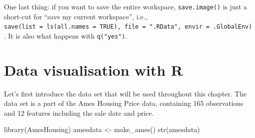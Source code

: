 \documentclass[
]{book}
\newenvironment{Shaded}{\begin{snugshade}}{\end{snugshade}}
\newcommand{\FunctionTok}[1]{\textcolor[rgb]{0.00,0.00,0.00}{#1}}
\newcommand{\NormalTok}[1]{#1}
\newcommand{\OtherTok}[1]{\textcolor[rgb]{0.56,0.35,0.01}{#1}}
\theoremstyle{definition}
\theoremstyle{definition}
\theoremstyle{definition}
\theoremstyle{definition}
\theoremstyle{remark}
\begin{document}
One last thing: if you want to save the entire workspace, \texttt{save.image()} is just a short-cut for ``save my current workspace'', i.e., \texttt{save(list\ =\ ls(all.names\ =\ TRUE),\ file\ =\ ".RData",\ envir\ =\ .GlobalEnv)}. It is also what happens with \texttt{q("yes")}.

\hypertarget{data-visualisation-with-r}{%
\chapter{Data visualisation with R}\label{data-visualisation-with-r}}

Let's first introduce the data set that will be used throughout this chapter. The data set is a part of the Ames Housing Price data, containing 165 observations and 12 features including the sale date and price.

\begin{Shaded}
\begin{Highlighting}[]
\FunctionTok{library}\NormalTok{(AmesHousing)}
\NormalTok{amesdata }\OtherTok{\textless{}{-}} \FunctionTok{make\_ames}\NormalTok{()}
\FunctionTok{str}\NormalTok{(amesdata)}
\end{Highlighting}
\end{Shaded}
\end{document}
